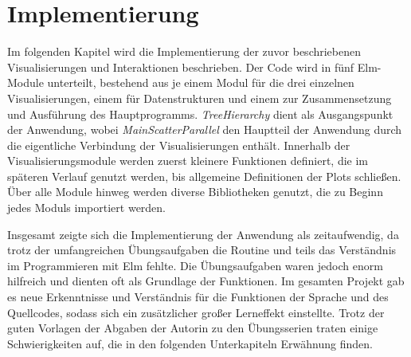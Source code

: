 \documentclass[usegeometry=true]{scrartcl}
\begin{document}
\section{Implementierung}
Im folgenden Kapitel wird die Implementierung der zuvor beschriebenen Visualisierungen und Interaktionen beschrieben. 
Der Code wird in fünf Elm-Module unterteilt, bestehend aus je einem Modul für die drei einzelnen Visualisierungen, einem für Datenstrukturen und einem zur Zusammensetzung und Ausführung des Hauptprogramms. 
\textit{TreeHierarchy} dient als Ausgangspunkt der Anwendung, wobei \textit{MainScatterParallel} den Hauptteil der Anwendung durch die eigentliche Verbindung der Visualisierungen enthält.
Innerhalb der Visualisierungsmodule werden zuerst kleinere Funktionen definiert, die im späteren Verlauf genutzt werden, bis allgemeine Definitionen der Plots schließen. 
Über alle Module hinweg werden diverse Bibliotheken genutzt, die zu Beginn jedes Moduls importiert werden.  
           
Insgesamt zeigte sich die Implementierung der Anwendung als zeitaufwendig, da trotz der umfangreichen Übungsaufgaben die Routine und teils das Verständnis im Programmieren mit Elm fehlte.
Die Übungsaufgaben waren jedoch enorm hilfreich und dienten oft als Grundlage der Funktionen.
Im gesamten Projekt gab es neue Erkenntnisse und Verständnis für die Funktionen der Sprache und des Quellcodes, sodass sich ein zusätzlicher großer Lerneffekt einstellte.
Trotz der guten Vorlagen der Abgaben der Autorin zu den Übungsserien traten einige Schwierigkeiten auf, die in den folgenden Unterkapiteln Erwähnung finden.
          
\end{document}
